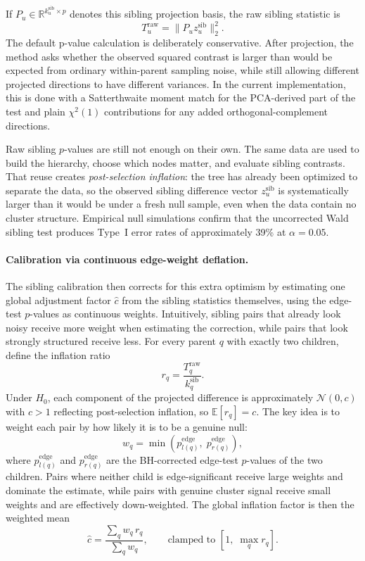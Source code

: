 If $P_u \in \mathbb{R}^{k_u^{\mathrm{sib}} \times p}$ denotes this sibling
projection basis, the raw sibling statistic is
\begin{equation}
T_u^{\mathrm{raw}}
=
\|P_u z_u^{\mathrm{sib}}\|_2^2.
\end{equation}
The default p-value calculation is deliberately conservative. After
projection, the method asks whether the observed squared contrast is larger
than would be expected from ordinary within-parent sampling noise, while still
allowing different projected directions to have different variances. In the
current implementation, this is done with a Satterthwaite moment match for the
PCA-derived part of the test and plain $\chi^2(1)$ contributions for any added
orthogonal-complement directions.

Raw sibling $p$-values are still not enough on their own. The same data are
used to build the hierarchy, choose which nodes matter, and evaluate sibling
contrasts. That reuse creates \emph{post-selection inflation}: the tree has
already been optimized to separate the data, so the observed sibling
difference vector $z_u^{\mathrm{sib}}$ is systematically larger than it would
be under a fresh null sample, even when the data contain no cluster structure.
Empirical null simulations confirm that the uncorrected Wald sibling test
produces Type~I error rates of approximately 39\% at $\alpha = 0.05$.

\paragraph{Calibration via continuous edge-weight deflation.}
The sibling calibration then corrects for this extra optimism by estimating one
global adjustment factor $\hat{c}$ from the sibling statistics themselves,
using the edge-test $p$-values as continuous weights. Intuitively, sibling
pairs that already look noisy receive more weight when estimating the
correction, while pairs that look strongly structured receive less. For every
parent $q$ with exactly two children, define the inflation ratio
\begin{equation}
r_q = \frac{T_q^{\mathrm{raw}}}{k_q^{\mathrm{sib}}}.
\end{equation}
Under $H_0$, each component of the projected difference is approximately
$\mathcal{N}(0,c)$ with $c > 1$ reflecting post-selection inflation, so
$\mathbb{E}[r_q] = c$.  The key idea is to weight each pair by how likely it
is to be a genuine null:
\begin{equation}
w_q = \min\!\left(p^{\mathrm{edge}}_{l(q)},\;
                    p^{\mathrm{edge}}_{r(q)}\right),
\end{equation}
where $p^{\mathrm{edge}}_{l(q)}$ and $p^{\mathrm{edge}}_{r(q)}$ are the
BH-corrected edge-test $p$-values of the two children. Pairs where neither
child is edge-significant receive large weights and dominate the estimate,
while pairs with genuine cluster signal receive small weights and are
effectively down-weighted. The global inflation factor is then the
weighted mean
\begin{equation}\label{eq:chat-global}
\hat{c}
=
\frac{\sum_q w_q \, r_q}{\sum_q w_q},
\qquad
\text{clamped to } [1,\;\max_q r_q].
\end{equation}


